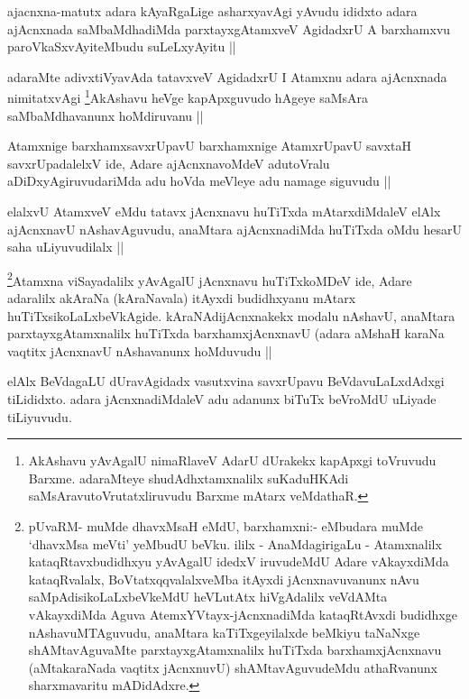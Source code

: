 \begin{artha}
ajacnxna-matutx adara kAyaRgaLige asharxyavAgi yAvudu ididxto adara
ajAcnxnada saMbaMdhadiMda parxtayxgAtamxveV AgidadxrU A barxhamxvu
paroVkaSxvAyiteMbudu suLeLxyAyitu ||
\end{artha}

\begin{artha}
adaraMte adivxtiVyavAda tatavxveV AgidadxrU I Atamxnu adara ajAcnxnada
nimitatxvAgi \footnote[1]{AkAshavu yAvAgalU nimaRlaveV AdarU dUrakekx
  kapApxgi toVruvudu Barxme. adaraMteye shudAdhxtamxnalilx suKaduHKAdi
saMsAravutoVrutatxliruvudu Barxme mAtarx veMdathaR.}AkAshavu heVge kapApxguvudo hAgeye saMsAra
saMbaMdhavanunx hoMdiruvanu ||
\end{artha}

\begin{artha}
Atamxnige barxhamxsavxrUpavU barxhamxnige AtamxrUpavU savxtaH
savxrUpadalelxV ide, Adare ajAcnxnavoMdeV adutoVralu
aDiDxyAgiruvudariMda adu hoVda meVleye adu namage siguvudu ||
\end{artha}

\begin{artha}
elalxvU AtamxveV eMdu tatavx jAcnxnavu huTiTxda mAtarxdiMdaleV elAlx
ajAcnxnavU nAshavAguvudu, anaMtara ajAcnxnadiMda huTiTxda oMdu hesarU
saha uLiyuvudilalx ||
\end{artha}

\begin{artha}
\footnote[1]{pUvaRM- muMde dhavxMsaH eMdU, barxhamxni:- eMbudara muMde
`dhavxMsa meVti' yeMbudU beVku. ililx - AnaMdagirigaLu - Atamxnalilx
  kataqRtavxbudidhxyu yAvAgalU idedxV iruvudeMdU Adare vAkayxdiMda
  kataqRvalalx, BoVtatxqqvalalxveMba itAyxdi jAcnxnavuvanunx nAvu
  saMpAdisikoLaLxbeVkeMdU heVLutAtx hiVgAdalilx veVdAMta vAkayxdiMda
  Aguva AtemxYVtayx-jAcnxnadiMda kataqRtAvxdi budidhxge
  nAshavuMTAguvudu, anaMtara kaTiTxgeyilalxde beMkiyu taNaNxge
  shAMtavAguvaMte parxtayxgAtamxnalilx huTiTxda barxhamxjAcnxnavu
  (aMtakaraNada vaqtitx jAcnxnuvU) shAMtavAguvudeMdu athaRvanunx
  sharxmavaritu mADidAdxre.}Atamxna viSayadalilx yAvAgalU jAcnxnavu huTiTxkoMDeV ide, Adare
adaralilx akAraNa (kAraNavala) itAyxdi budidhxyanu mAtarx
huTiTxsikoLaLxbeVkAgide. kAraNAdijAcnxnakekx modalu nAshavU, anaMtara
parxtayxgAtamxnalilx huTiTxda barxhamxjAcnxnavU (adara aMshaH karaNa
vaqtitx jAcnxnavU nAshavanunx hoMduvudu ||
\end{artha}

\begin{artha}
elAlx BeVdagaLU dUravAgidadx vasutxvina savxrUpavu BeVdavuLaLxdAdxgi
tiLididxto. adara jAcnxnadiMdaleV adu adanunx biTuTx beVroMdU uLiyade tiLiyuvudu.
\end{artha}

